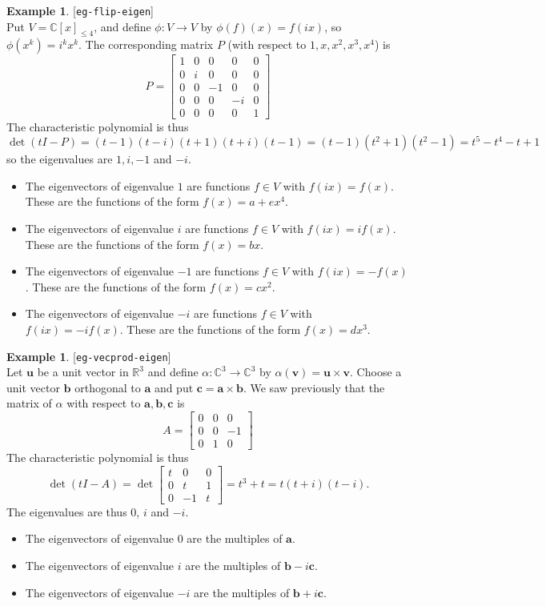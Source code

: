 \documentclass{amsart}
\newcommand{\lbl}[1]{\label{#1}\textup{[\texttt{#1}]}\ \\}
\newcommand{\lbl}{\label}
\newcommand{\R}         {{\mathbb{R}}}
\newcommand{\C}         {{\mathbb{C}}}
\newcommand{\bsm}       {\left[\begin{smallmatrix}}
\newcommand{\esm}       {\end{smallmatrix}\right]}
\newcommand{\al}        {\alpha}
\newcommand{\tm}        {\times}
\newcommand{\xra}       {\xrightarrow}
\newcommand{\va}        {\mathbf{a}}
\newcommand{\vb}        {\mathbf{b}}
\newcommand{\vc}        {\mathbf{c}}
\newcommand{\vu}        {\mathbf{u}}
\newcommand{\vv}        {\mathbf{v}}
\renewcommand{\:}       {\colon}
\theoremstyle{definition}
\newtheorem{example}[theorem]{Example}
\begin{document}
\begin{example}\lbl{eg-flip-eigen}
 Put $V=\C[x]_{\leq 4}$, and define $\phi\:V\xra{}V$ by
 $\phi(f)(x)=f(ix)$, so $\phi(x^k)=i^kx^k$.  The
 corresponding matrix $P$ (with respect to
 $1,x,x^2,x^3,x^4$) is
 {\small \[ P = \bsm 
   1 & 0 &  0 & 0  & 0 \\
   0 & i &  0 & 0  & 0 \\
   0 & 0 & -1 & 0  & 0 \\
   0 & 0 &  0 & -i & 0 \\
   0 & 0 &  0 & 0  & 1 
  \esm
 \]}
 The characteristic polynomial is thus 
 \[ \det(tI-P)=(t-1)(t-i)(t+1)(t+i)(t-1)=
      (t-1)(t^2+1)(t^2-1)=t^5-t^4-t+1
 \]
 so the eigenvalues are $1,i,-1$ and $-i$.
 \begin{itemize}
  \item The eigenvectors of eigenvalue $1$ are functions
   $f\in V$ with $f(ix)=f(x)$.  These are the functions of
   the form $f(x)=a+ex^4$.
  \item The eigenvectors of eigenvalue $i$ are functions
   $f\in V$ with $f(ix)=if(x)$.  These are the functions of
   the form $f(x)=bx$.
  \item The eigenvectors of eigenvalue $-1$ are functions
   $f\in V$ with $f(ix)=-f(x)$.  These are the functions of
   the form $f(x)=cx^2$.
  \item The eigenvectors of eigenvalue $-i$ are functions
   $f\in V$ with $f(ix)=-if(x)$.  These are the functions of
   the form $f(x)=dx^3$.
  \end{itemize}
\end{example}

\begin{example}\lbl{eg-vecprod-eigen}
 Let $\vu$ be a unit vector in $\R^3$ and define
 $\al\:\C^3\xra{}\C^3$ by $\al(\vv)=\vu\tm\vv$.  Choose a
 unit vector $\vb$ orthogonal to $\va$ and put
 $\vc=\va\tm\vb$.  We saw previously that the matrix of
 $\al$ with respect to $\va,\vb,\vc$ is 
 \[ A = \bsm 0 & 0 & 0 \\
             0 & 0 & -1 \\
             0 & 1 & 0 \esm 
 \]
 The characteristic polynomial is thus
 \[ \det(tI-A) = 
    \det\bsm t & 0 & 0 \\
             0 & t & 1 \\
             0 & -1 & t \esm = t^3+t
     = t(t+i)(t-i).
 \]
 The eigenvalues are thus $0$, $i$ and $-i$.  
 \begin{itemize}
  \item The eigenvectors of eigenvalue $0$ are the multiples
   of $\va$.
  \item The eigenvectors of eigenvalue $i$ are the multiples
   of $\vb-i\vc$.
  \item The eigenvectors of eigenvalue $-i$ are the multiples
   of $\vb+i\vc$.
 \end{itemize}
\end{example}
\end{document}
